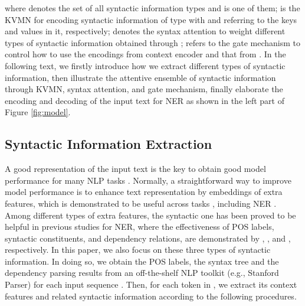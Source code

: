 \documentclass[11pt,a4paper]{article}
\begin{document}
where  denotes the set of all syntactic information types and  is one of them;
 is the KVMN for encoding syntactic information of type  with  and  referring to the keys and values in it,
respectively;
 denotes the syntax attention to weight different types of syntactic information obtained through ;
 refers to the gate mechanism to control how to use the encodings from context encoder and that from .
In the following text, we firstly introduce how we extract different types of syntactic information, then illustrate the attentive ensemble of syntactic information through KVMN, syntax attention, and gate mechanism,
finally elaborate the encoding and decoding of the input text for NER as shown in the left part of Figure \ref{fig:model}.













\subsection{Syntactic Information Extraction}






A good representation of the input text is the key to obtain good model performance for many NLP tasks \cite{song2017learning,sileo-etal-2019-mining}.
Normally, a straightforward way to improve model performance is to enhance text representation by embeddings of extra features, which is demonstrated to be useful across tasks \cite{marcheggiani-titov-2017-encoding,song-etal-2018-joint,zhang-etal-2019-incorporating,huang2019syntax,tian-etal-2020-constituency}, including NER \cite{DBLP:conf/acl/ZhangY18,DBLP:conf/acl/SeylerDCHW18,DBLP:conf/emnlp/SuiCLZL19,DBLP:conf/emnlp/GuiZZPFWH19,DBLP:conf/ijcai/GuiM0ZJH19,DBLP:conf/acl/LiuYL19}.
Among different types of extra features, the syntactic one
has been proved to be helpful in previous studies for NER, where the effectiveness of POS labels, syntactic constituents, and dependency relations, are demonstrated by , , and , respectively.
In this paper, we also focus on these three types of syntactic information.
In doing so, we obtain the POS labels, the syntax tree and the dependency parsing results from an off-the-shelf NLP toolkit (e.g., Stanford Parser) for each input sequence . 
Then, for each token  in , we extract its context features and related syntactic information according to the following procedures.
\end{document}
